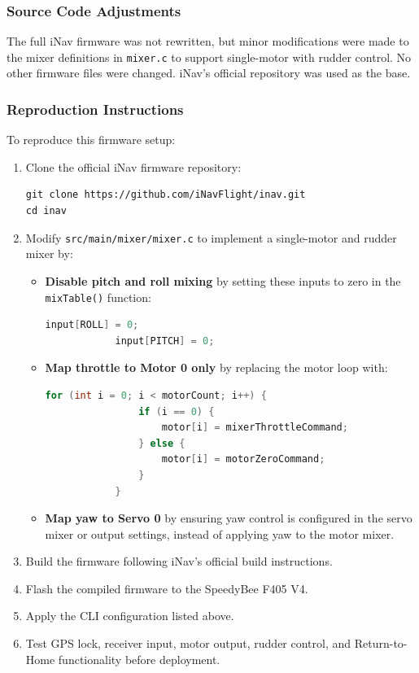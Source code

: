 \subsubsection*{Source Code Adjustments}

The full iNav firmware was not rewritten, but minor modifications were made to the mixer definitions in \texttt{mixer.c} to support single-motor with rudder control. No other firmware files were changed. iNav’s official repository was used as the base.

\subsubsection*{Reproduction Instructions}

To reproduce this firmware setup:

\begin{enumerate}
    \item Clone the official iNav firmware repository:
    \begin{lstlisting}
git clone https://github.com/iNavFlight/inav.git
cd inav
    \end{lstlisting}

    
    \item Modify \texttt{src/main/mixer/mixer.c} to implement a single-motor and rudder mixer by:
    \begin{itemize}
        \item \textbf{Disable pitch and roll mixing} by setting these inputs to zero in the \texttt{mixTable()} function:
        \begin{lstlisting}[language=C]
            input[ROLL] = 0;
            input[PITCH] = 0;
        \end{lstlisting}

        \item \textbf{Map throttle to Motor 0 only} by replacing the motor loop with:
        \begin{lstlisting}[language=C]
            for (int i = 0; i < motorCount; i++) {
                if (i == 0) {
                    motor[i] = mixerThrottleCommand;
                } else {
                    motor[i] = motorZeroCommand;
                }
            }
        \end{lstlisting}

        \item \textbf{Map yaw to Servo 0} by ensuring yaw control is configured in the servo mixer or output settings, instead of applying yaw to the motor mixer.
    \end{itemize}


    \item Build the firmware following iNav's official build instructions.

    \item Flash the compiled firmware to the SpeedyBee F405 V4.

    \item Apply the CLI configuration listed above.

    \item Test GPS lock, receiver input, motor output, rudder control, and Return-to-Home functionality before deployment.
\end{enumerate}